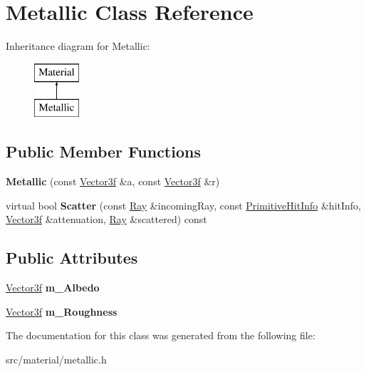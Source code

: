 \hypertarget{class_metallic}{}\section{Metallic Class Reference}
\label{class_metallic}
Inheritance diagram for Metallic\+:\begin{figure}[H]
\begin{center}
\leavevmode
\includegraphics[height=2.000000cm]{class_metallic}
\end{center}
\end{figure}
\subsection*{Public Member Functions}
\begin{DoxyCompactItemize}
\item 
\mbox{\label{class_metallic_a01493fe5fc84c966cdfebb18e8010e61}} 
{\bfseries Metallic} (const \mbox{\hyperlink{class_vector3}{Vector3f}} \&a, const \mbox{\hyperlink{class_vector3}{Vector3f}} \&r)
\item 
\mbox{\label{class_metallic_a4fbac3b517dbf1f1f6f45f5b9ac1fcb8}} 
virtual bool {\bfseries Scatter} (const \mbox{\hyperlink{class_ray}{Ray}} \&incoming\+Ray, const \mbox{\hyperlink{struct_primitive_hit_info}{Primitive\+Hit\+Info}} \&hit\+Info, \mbox{\hyperlink{class_vector3}{Vector3f}} \&attenuation, \mbox{\hyperlink{class_ray}{Ray}} \&scattered) const
\end{DoxyCompactItemize}
\subsection*{Public Attributes}
\begin{DoxyCompactItemize}
\item 
\mbox{\label{class_metallic_ab7fc6ac210b646f2491e75b6cb73646f}} 
\mbox{\hyperlink{class_vector3}{Vector3f}} {\bfseries m\+\_\+\+Albedo}
\item 
\mbox{\label{class_metallic_a84f0a4bcf4f81fd72ecb341b8217580b}} 
\mbox{\hyperlink{class_vector3}{Vector3f}} {\bfseries m\+\_\+\+Roughness}
\end{DoxyCompactItemize}


The documentation for this class was generated from the following file\+:\begin{DoxyCompactItemize}
\item 
src/material/metallic.\+h\end{DoxyCompactItemize}
